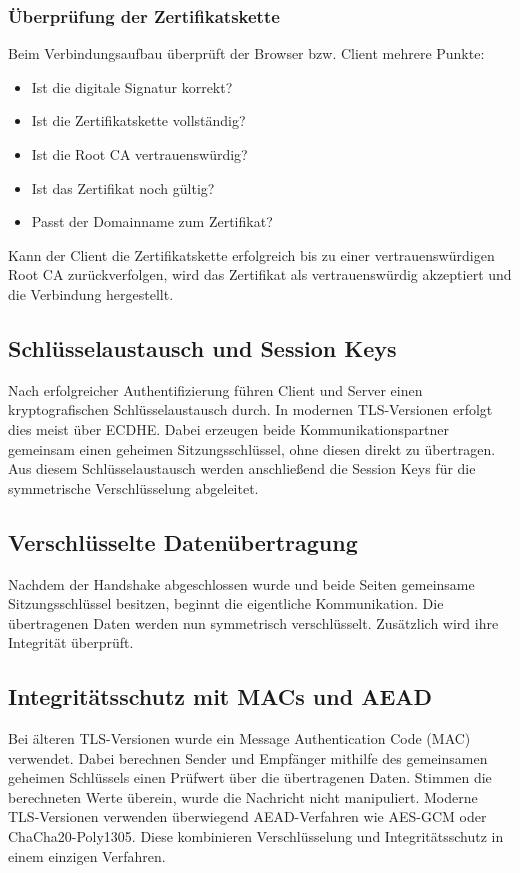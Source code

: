 \subsubsection*{Überprüfung der Zertifikatskette}
Beim Verbindungsaufbau überprüft der Browser bzw. Client mehrere Punkte:
\begin{itemize}
  \item Ist die digitale Signatur korrekt?
  \item Ist die Zertifikatskette vollständig?
  \item Ist die Root CA vertrauenswürdig?
  \item Ist das Zertifikat noch gültig?
  \item Passt der Domainname zum Zertifikat?
\end{itemize}
Kann der Client die Zertifikatskette erfolgreich bis zu einer vertrauenswürdigen Root CA zurückverfolgen, wird das Zertifikat als vertrauenswürdig akzeptiert und die Verbindung hergestellt.

\subsection*{Schlüsselaustausch und Session Keys}
Nach erfolgreicher Authentifizierung führen Client und Server einen kryptografischen Schlüsselaustausch durch. In modernen TLS-Versionen erfolgt dies meist über ECDHE. Dabei erzeugen beide Kommunikationspartner gemeinsam einen geheimen Sitzungsschlüssel, ohne diesen direkt zu übertragen. Aus diesem Schlüsselaustausch werden anschließend die Session Keys für die symmetrische Verschlüsselung abgeleitet.

\subsection*{Verschlüsselte Datenübertragung}
Nachdem der Handshake abgeschlossen wurde und beide Seiten gemeinsame Sitzungsschlüssel besitzen, beginnt die eigentliche Kommunikation. Die übertragenen Daten werden nun symmetrisch verschlüsselt. Zusätzlich wird ihre Integrität überprüft.

\subsection*{Integritätsschutz mit MACs und AEAD}
Bei älteren TLS-Versionen wurde ein Message Authentication Code (MAC) verwendet. Dabei berechnen Sender und Empfänger mithilfe des gemeinsamen geheimen Schlüssels einen Prüfwert über die übertragenen Daten. Stimmen die berechneten Werte überein, wurde die Nachricht nicht manipuliert. Moderne TLS-Versionen verwenden überwiegend AEAD-Verfahren wie AES-GCM oder ChaCha20-Poly1305. Diese kombinieren Verschlüsselung und Integritätsschutz in einem einzigen Verfahren.

